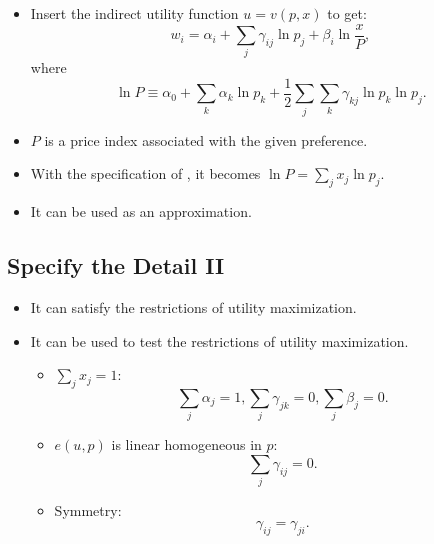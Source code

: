 \documentclass[
]{book}
\providecommand{\tightlist}{%
  \setlength{\itemsep}{0pt}\setlength{\parskip}{0pt}}
\begin{document}
\begin{itemize}
\tightlist
\item
  Insert the indirect utility function \(u = v(p, x)\) to get:
  \begin{equation}
  w_i = \alpha_i + \sum_{j} \gamma_{ij} \ln p_j + \beta_i \ln \frac{x}{P},
  \end{equation}
  where
  \begin{equation}
  \ln P \equiv  \alpha_0 + \sum_{k} \alpha_k \ln p_k + \frac{1}{2} \sum_{j} \sum_{k} \gamma_{kj} \ln p_k \ln p_j.
  \end{equation}
\item
  \(P\) is a price index associated with the given preference.
\item
  With the specification of \citet{RichardStone1954}, it becomes \(\ln P = \sum_{j} x_j \ln p_j\).
\item
  It can be used as an approximation.
\end{itemize}

\hypertarget{specify-the-detail-ii}{%
\subsection{Specify the Detail II}\label{specify-the-detail-ii}}

\begin{itemize}
\tightlist
\item
  It can satisfy the restrictions of utility maximization.
\item
  It can be used to test the restrictions of utility maximization.

  \begin{itemize}
  \tightlist
  \item
    \(\sum_{j} x_j = 1\):
    \begin{equation}
    \sum_{j} \alpha_j = 1, \sum_{j} \gamma_{jk} = 0, \sum_{j} \beta_j = 0.
    \end{equation}
  \item
    \(e(u, p)\) is linear homogeneous in \(p\):
    \begin{equation}
    \sum_{j} \gamma_{ij} = 0.
    \end{equation}
  \item
    Symmetry:
    \begin{equation}
    \gamma_{ij} = \gamma_{ji}.
    \end{equation}
  \end{itemize}
\end{itemize}
\end{document}
